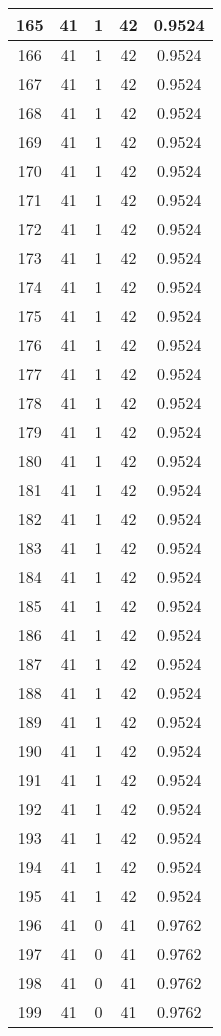 \documentclass[letterpaper, 12pt]{article}
\begin{document}
\begin{longtable}{|c|c|c|c|c|}
\hline
165 & 41 & 1 & 42 & 0.9524 \\
\hline
166 & 41 & 1 & 42 & 0.9524 \\
\hline
167 & 41 & 1 & 42 & 0.9524 \\
\hline
168 & 41 & 1 & 42 & 0.9524 \\
\hline
169 & 41 & 1 & 42 & 0.9524 \\
\hline
170 & 41 & 1 & 42 & 0.9524 \\
\hline
171 & 41 & 1 & 42 & 0.9524 \\
\hline
172 & 41 & 1 & 42 & 0.9524 \\
\hline
173 & 41 & 1 & 42 & 0.9524 \\
\hline
174 & 41 & 1 & 42 & 0.9524 \\
\hline
175 & 41 & 1 & 42 & 0.9524 \\
\hline
176 & 41 & 1 & 42 & 0.9524 \\
\hline
177 & 41 & 1 & 42 & 0.9524 \\
\hline
178 & 41 & 1 & 42 & 0.9524 \\
\hline
179 & 41 & 1 & 42 & 0.9524 \\
\hline
180 & 41 & 1 & 42 & 0.9524 \\
\hline
181 & 41 & 1 & 42 & 0.9524 \\
\hline
182 & 41 & 1 & 42 & 0.9524 \\
\hline
183 & 41 & 1 & 42 & 0.9524 \\
\hline
184 & 41 & 1 & 42 & 0.9524 \\
\hline
185 & 41 & 1 & 42 & 0.9524 \\
\hline
186 & 41 & 1 & 42 & 0.9524 \\
\hline
187 & 41 & 1 & 42 & 0.9524 \\
\hline
188 & 41 & 1 & 42 & 0.9524 \\
\hline
189 & 41 & 1 & 42 & 0.9524 \\
\hline
190 & 41 & 1 & 42 & 0.9524 \\
\hline
191 & 41 & 1 & 42 & 0.9524 \\
\hline
192 & 41 & 1 & 42 & 0.9524 \\
\hline
193 & 41 & 1 & 42 & 0.9524 \\
\hline
194 & 41 & 1 & 42 & 0.9524 \\
\hline
195 & 41 & 1 & 42 & 0.9524 \\
\hline
196 & 41 & 0 & 41 & 0.9762 \\
\hline
197 & 41 & 0 & 41 & 0.9762 \\
\hline
198 & 41 & 0 & 41 & 0.9762 \\
\hline
199 & 41 & 0 & 41 & 0.9762 \\
\hline
\end{longtable}
\end{document}
